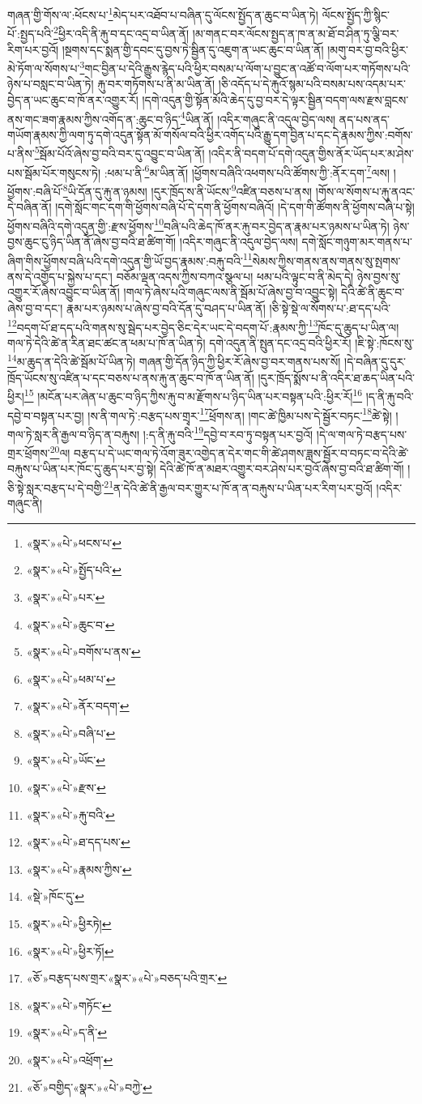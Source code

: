 གཞན་གྱི་གོས་ལ་:ཕོངས་པ་\footnote{«སྣར་»«པེ་»ཕངས་པ་}མེད་པར་འཐོབ་པ་བཞིན་དུ་ལོངས་སྤྱོད་ན་ཆུང་བ་ཡིན་ཏེ། ལོངས་སྤྱོད་ཀྱི་སྙིང་པོ་:སྤྱད་པའི་\footnote{«སྣར་»«པེ་»སྤྱོད་པའི་}ཕྱིར་འདི་ནི་རྐུ་བ་དང་འདྲ་བ་ཡིན་ནོ། །མ་གནང་བར་ལོངས་སྤྱད་ན་ཁ་ན་མ་ཐོ་བ་ཤིན་ཏུ་ལྕི་བར་རིག་པར་བྱའོ། །སྔགས་དང་སྨན་གྱི་དབང་དུ་བྱས་ཏེ་སྦྱིན་དུ་འཇུག་ན་ཡང་ཆུང་བ་ཡིན་ནོ། །མགུ་བར་བྱ་བའི་ཕྱིར་མེ་ཏོག་ལ་སོགས་པ་\footnote{«སྣར་»«པེ་»པར་}གང་བྱིན་པ་དེའི་རྒྱུས་རྙེད་པའི་ཕྱིར་བསམ་པ་ལོག་པ་བྱུང་ན་འཚོ་བ་ལོག་པར་གཏོགས་པའི་ཉེས་པ་བསླང་བ་ཡིན་ཏེ། རྐུ་བར་གཏོགས་པ་ནི་མ་ཡིན་ནོ། །ཅི་འདོད་པ་དེ་རྐུའོ་སྙམ་པའི་བསམ་པས་འདམ་པར་བྱེད་ན་ཡང་ཆུང་བ་ཁོ་ནར་འགྱུར་རོ། །དགེ་འདུན་གྱི་སྟོན་མོའི་ཆེད་དུ་བྱ་བར་དེ་ལྟར་སྦྱིན་བདག་ལས་རྫས་བླངས་ནས་གང་ཟག་རྣམས་ཀྱིས་འགོད་ན་:ཆུང་བ་ཉིད་\footnote{«སྣར་»«པེ་»ཆུང་བ་}ཡིན་ནོ། །འདིར་གཞུང་ནི་འདུལ་བྱེད་ལས། ནད་པས་ནད་གཡོག་རྣམས་ཀྱི་ལག་ཏུ་དགེ་འདུན་སྟོན་མོ་གསོལ་བའི་ཕྱིར་འགོད་པའི་རྒྱུ་དག་བྱིན་པ་དང་དེ་རྣམས་ཀྱིས་:བགོས་པ་ནིས་\footnote{«སྣར་»«པེ་»བགོས་པ་ནས་}སྦོམ་པོའོ་ཞེས་བྱ་བའི་བར་དུ་འབྱུང་བ་ཡིན་ནོ། །འདིར་ནི་བདག་པོ་དགེ་འདུན་གྱིས་ནོར་ཡོད་པར་མ་ཤེས་པས་སྦོམ་པོར་གསུངས་ཏེ། :ཕམ་པ་ནི་\footnote{«སྣར་»«པེ་»ཕམ་པ་}མ་ཡིན་ནོ། །ཕྱོགས་བཞིའི་འཕགས་པའི་ཚོགས་ཀྱི་:ནོར་དག་\footnote{«སྣར་»«པེ་»ནོར་བདག་}ལས། །ཕྱོགས་:བཞི་པོ་\footnote{«སྣར་»«པེ་»བཞི་པ་}ཡི་དོན་དུ་རྐུ་ན་ཉམས། །དུར་ཁྲོད་ས་ནི་ཡོངས་\footnote{«སྣར་»«པེ་»ཡོང་}འཛིན་བཅས་པ་ནས། །གོས་ལ་སོགས་པ་རྐུ་ནའང་དེ་བཞིན་ནོ། །དགེ་སློང་གང་དག་གི་ཕྱོགས་བཞི་པོ་དེ་དག་ནི་ཕྱོགས་བཞིའོ། །དེ་དག་གི་ཚོགས་ནི་ཕྱོགས་བཞི་པ་སྟེ། ཕྱོགས་བཞིའི་དགེ་འདུན་གྱི་:རྫས་ཕྱོགས་\footnote{«སྣར་»«པེ་»རྫས་}བཞི་པའི་ཆེད་ཁོ་ནར་རྐུ་བར་བྱེད་ན་རྣམ་པར་ཉམས་པ་ཡིན་ཏེ། ཉེས་བྱས་ཆུང་ངུ་ཉིད་ཡིན་ནོ་ཞེས་བྱ་བའི་ཐ་ཚིག་གོ། །འདིར་གཞུང་ནི་འདུལ་བྱེད་ལས། དགེ་སློང་གཉུག་མར་གནས་པ་ཞིག་གིས་ཕྱོགས་བཞི་པའི་དགེ་འདུན་གྱི་ཡོ་བྱད་རྣམས་:བརྐུ་བའི་\footnote{«སྣར་»«པེ་»རྐུ་བའི་}སེམས་ཀྱིས་གནས་ནས་གནས་སུ་སྤགས་ནས་དེ་འགྱོད་པ་སྐྱེས་པ་དང་། བཅོམ་ལྡན་འདས་ཀྱིས་བཀའ་སྩལ་པ། ཕམ་པའི་ལྟུང་བ་ནི་མེད་དེ། ཉེས་བྱས་སུ་འགྱུར་རོ་ཞེས་འབྱུང་བ་ཡིན་ནོ། །གལ་ཏེ་ཞེས་པའི་གཞུང་ལས་ནི་སྦོམ་པོ་ཞེས་བྱ་བ་འབྱུང་སྟེ། དེའི་ཚེ་ནི་ཆུང་བ་ཞེས་བྱ་བ་དང་། རྣམ་པར་ཉམས་པ་ཞེས་བྱ་བའི་དོན་དུ་བཤད་པ་ཡིན་ནོ། །ཅི་སྟེ་སྡེ་ལ་སོགས་པ་:ཐ་དད་པའི་\footnote{«སྣར་»«པེ་»ཐ་དད་པས་}བདག་པོ་ཐ་དད་པའི་གནས་སུ་སྦེད་པར་བྱེད་ཅིང་དེར་ཡང་དེ་བདག་པོ་:རྣམས་ཀྱི་\footnote{«སྣར་»«པེ་»རྣམས་ཀྱིས་}ཁོང་དུ་ཆུད་པ་ཡིན་ལ། གལ་ཏེ་དེའི་ཚེ་ན་རིན་ཐང་ཚང་ན་ཕམ་པ་ཁོ་ན་ཡིན་ཏེ། དགེ་འདུན་ནི་སྤུན་དང་འདྲ་བའི་ཕྱིར་རོ། །ཇི་སྟེ་:ཁོངས་སུ་\footnote{«སྡེ་»ཁོང་དུ་}མ་ཆུད་ན་དེའི་ཚེ་སྦོམ་པོ་ཡིན་ཏེ། གཞན་གྱི་དོན་ཉིད་ཀྱི་ཕྱིར་རོ་ཞེས་བྱ་བར་གནས་པས་སོ། །དེ་བཞིན་དུ་དུར་ཁྲོད་ཡོངས་སུ་འཛིན་པ་དང་བཅས་པ་ནས་རྐུ་ན་ཆུང་བ་ཁོ་ན་ཡིན་ནོ། །དུར་ཁྲོད་སྨོས་པ་ནི་འདིར་ཐ་ཆད་ཡིན་པའི་ཕྱིར།\footnote{«སྣར་»«པེ་»ཕྱིརཏེ།} །མངོན་པར་ཞེན་པ་ཆུང་བ་ཉིད་ཀྱིས་རྐུ་བ་མ་རྫོགས་པ་ཉིད་ཡིན་པར་བསྟན་པའི་:ཕྱིར་རོ།\footnote{«སྣར་»«པེ་»ཕྱིར་ཏོ།} །ད་ནི་རྐུ་བའི་དབྱེ་བ་བསྟན་པར་བྱ། །ས་ནི་གལ་ཏེ་:བརྩད་པས་གྲྭར་\footnote{«ཅོ་»བརྩད་པས་གྲར་«སྣར་»«པེ་»བཅད་པའི་གྲར་}ཕྲོགས་ན། །གང་ཚེ་ཁྱིམ་པས་དེ་སྦྱོར་བཏང་\footnote{«སྣར་»«པེ་»གཏོང་}ཚེ་སྟེ། །གལ་ཏེ་སླར་ནི་རྒྱལ་བ་ཉིད་ན་བརྐུས། །:ད་ནི་རྐུ་བའི་\footnote{«སྣར་»«པེ་»ད་ནི་}དབྱེ་བ་རབ་ཏུ་བསྟན་པར་བྱའོ། །དེ་ལ་གལ་ཏེ་བརྩད་པས་གྲར་ཕྲོགས་\footnote{«སྣར་»«པེ་»འཕྲོག་}ལ། བརྩད་པ་དེ་ཡང་གལ་ཏེ་འོག་ཟུར་འགྱེད་ན་དེར་གང་གི་ཚེ་ཤགས་ཟླས་སྦྱོར་བ་བཏང་བ་དེའི་ཚེ་བརྐུས་པ་ཡིན་པར་ཁོང་དུ་ཆུད་པར་བྱ་སྟེ། དེའི་ཚེ་ཁོ་ན་མཐར་འགྱུར་བར་ཤེས་པར་བྱའོ་ཞེས་བྱ་བའི་ཐ་ཚིག་གོ། །ཅི་སྟེ་སླར་བརྩད་པ་དེ་བགྱི་\footnote{«ཅོ་»བགྱིད་«སྣར་»«པེ་»བཀྱེ་}ན་དེའི་ཚེ་ནི་རྒྱལ་བར་གྱུར་པ་ཁོ་ན་ན་བརྐུས་པ་ཡིན་པར་རིག་པར་བྱའོ། །འདིར་གཞུང་ནི། 